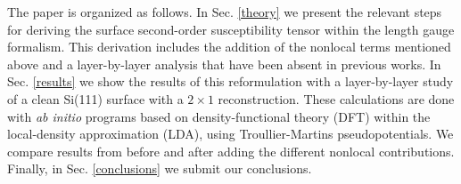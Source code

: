 The paper is organized as follows. 
In Sec. \ref{theory} we present the 
relevant steps for deriving the surface second-order susceptibility tensor 
within the length gauge formalism. This derivation includes the addition of 
the nonlocal terms mentioned above and a layer-by-layer analysis that have 
been absent in previous works. 
In Sec. \ref{results} we show the results of this 
reformulation with a layer-by-layer study of a clean Si(111) surface with a 
$2 \times 1$ reconstruction. These calculations are done with \emph{ab initio}
programs based on density-functional theory (DFT) within the local-density 
approximation (LDA), using Troullier-Martins pseudopotentials. We compare 
results from before and after adding the different nonlocal contributions.
Finally, in Sec. \ref{conclusions} we submit our conclusions.
